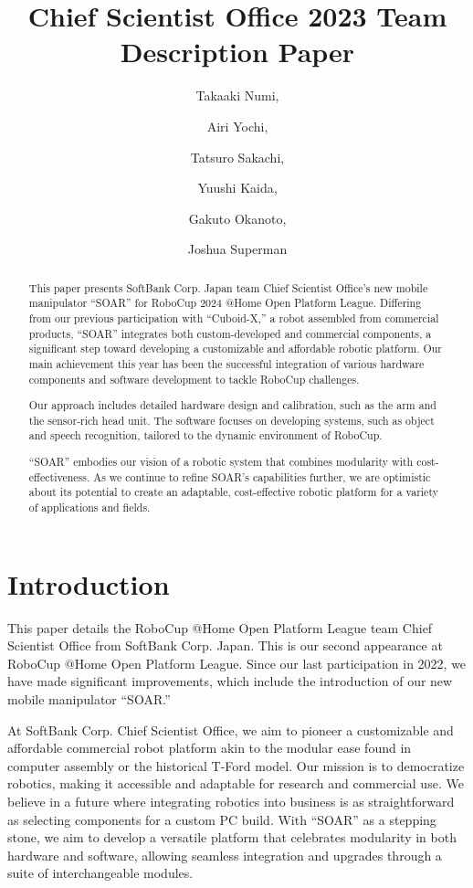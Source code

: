 \documentclass[runningheads,a4paper]{llncs}
\title{Chief Scientist Office 2023 Team Description Paper}
\author{Takaaki Numi, \and Airi Yochi, \and Tatsuro Sakachi, \and Yuushi Kaida, \and Gakuto Okanoto, \and Joshua Superman}
\institute{Affiliation name and address, \\
\texttt{http://devoted-web-site.url}}
\begin{document}
\maketitle

%
%

\begin{abstract}
	This paper presents SoftBank Corp. Japan team Chief Scientist Office’s new mobile manipulator “SOAR” for RoboCup 2024 @Home Open Platform League.
	Differing from our previous participation with “Cuboid-X,” a robot assembled from commercial products, “SOAR” integrates both custom-developed and commercial components, a significant step toward developing a customizable and affordable robotic platform.
	Our main achievement this year has been the successful integration of various hardware components and software development to tackle RoboCup challenges.

	Our approach includes detailed hardware design and calibration, such as the arm and the sensor-rich head unit.
	The software focuses on developing systems, such as object and speech recognition, tailored to the dynamic environment of RoboCup.

	“SOAR” embodies our vision of a robotic system that combines modularity with cost-effectiveness.
	As we continue to refine SOAR’s capabilities further, we are optimistic about its potential to create an adaptable, cost-effective robotic platform for a variety of applications and fields.

\end{abstract}



\section{Introduction}
This paper details the RoboCup @Home Open Platform League team Chief Scientist Office from SoftBank Corp. Japan.
This is our second appearance at RoboCup @Home Open Platform League.
Since our last participation in 2022, we have made significant improvements, which include the introduction of our new mobile manipulator “SOAR.”

At SoftBank Corp. Chief Scientist Office, we aim to pioneer a customizable and affordable commercial robot platform akin to the modular ease found in computer assembly or the historical T-Ford model.
Our mission is to democratize robotics, making it accessible and adaptable for research and commercial use.
We believe in a future where integrating robotics into business is as straightforward as selecting components for a custom PC build.
With “SOAR” as a stepping stone, we aim to develop a versatile platform that celebrates modularity in both hardware and software, allowing seamless integration and upgrades through a suite of interchangeable modules.
\end{document}
